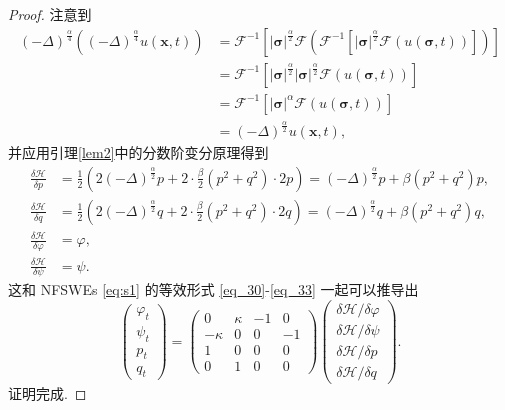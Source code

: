 \begin{proof}
注意到
\begin{align}\label{eq_12071}
(-\Delta)^{\frac{\alpha}{4}}((-\Delta)^{\frac{\alpha}{4}}  u(\boldsymbol{x},t))&=\mathcal{F}^{-1}\left[|\boldsymbol{\sigma}|^{\frac{\alpha}{2}} \mathcal{F}(\mathcal{F}^{-1}\left[|\boldsymbol{\sigma}|^{\frac{\alpha}{2}} \mathcal{F}(u(\boldsymbol{\sigma},t))\right])\right]\nonumber\\
&=\mathcal{F}^{-1}\left[|\boldsymbol{\sigma}|^{\frac{\alpha}{2}} |\boldsymbol{\sigma}|^{\frac{\alpha}{2}} \mathcal{F}(u(\boldsymbol{\sigma},t))\right]\nonumber\\
&=\mathcal{F}^{-1}\left[|\boldsymbol{\sigma}|^{\alpha} \mathcal{F}(u(\boldsymbol{\sigma},t))\right]\nonumber\\
&=(-\Delta)^{\frac{\alpha}{2}} u(\boldsymbol{x},t),
\end{align}
并应用引理\ref{lem2}中的分数阶变分原理得到
\begin{align}
\frac{\delta \mathcal{H}}{\delta p} &=\frac{1}{2}\left(2(-\Delta)^{\frac{\alpha}{2}} p+2 \cdot \frac{\beta}{2}\left(p^{2}+q^{2}\right) \cdot 2 p\right)=(-\Delta)^{\frac{\alpha}{2}}p+\beta\left(p^{2}+q^{2}\right) p,\label{eq_38a}\\
\frac{\delta \mathcal{H}}{\delta q} &=\frac{1}{2}\left(2(-\Delta)^{\frac{\alpha}{2}} q+2 \cdot \frac{\beta}{2}\left(p^{2}+q^{2}\right) \cdot 2 q\right)=(-\Delta)^{\frac{\alpha}{2}}q+\beta\left(p^{2}+q^{2}\right) q,\label{eq_38b}\\
\frac{\delta \mathcal{H}}{\delta \varphi} &=\varphi,\label{eq_38c}\\
\frac{\delta \mathcal{H}}{\delta \psi} &=\psi.\label{eq_38}
\end{align}
这和 NFSWEs \eqref{eq:s1} 的等效形式 \eqref{eq_30}-\eqref{eq_33} 一起可以推导出
\begin{equation}\label{eq_39}
\left(\begin{array}{l}
		\varphi_{t} \\
		\psi_{t} \\
		p_{t} \\
		q_{t}
\end{array}\right)
=\left(\begin{array}{cccc}
			0 & \kappa & -1 & 0 \\
			-\kappa & 0 & 0 & -1 \\
			1 & 0 & 0 & 0 \\
			0 & 1 & 0 & 0
\end{array}\right)
\left(\begin{array}{l}
		\delta \mathcal{H} / \delta \varphi \\
		\delta \mathcal{H} / \delta \psi \\
		\delta \mathcal{H} / \delta p \\
		\delta \mathcal{H} / \delta q
\end{array}\right).
\end{equation}
证明完成.
\end{proof}

